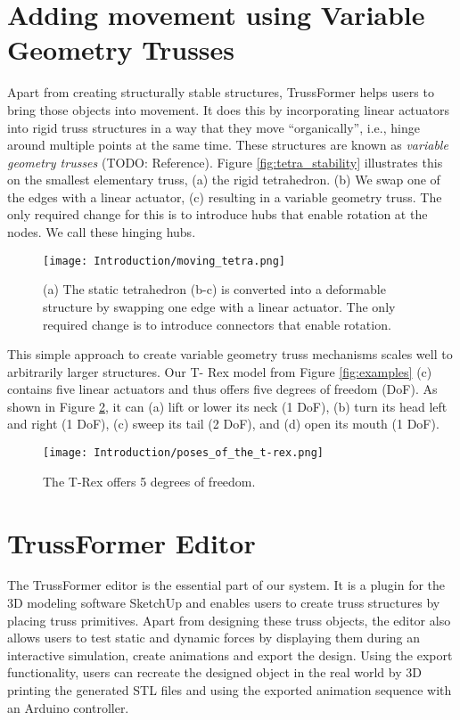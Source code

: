 \section{Adding movement using Variable Geometry Trusses}
Apart from creating structurally stable structures, TrussFormer helps users to bring those objects into movement. It does this by incorporating linear actuators into rigid truss structures in a way that they move ``organically'', i.e., hinge around multiple points at the same time. These structures are known as \textit{variable geometry trusses} (TODO: Reference).
Figure \ref{fig:tetra_stability} illustrates this on the smallest elementary truss, (a) the rigid tetrahedron. (b) We swap one of the edges with a linear actuator, (c) resulting in a variable geometry truss. The only required change for this is to introduce hubs that enable rotation at the nodes. We call these hinging hubs.
\begin{figure}[h!]
    \texttt{[image: Introduction/moving\_tetra.png]}
    \centering
    \caption{(a) The static tetrahedron (b-c) is converted into a deformable structure by swapping one edge with a linear actuator. The only required change is to introduce connectors that enable rotation.}
    \label{fig:moving_tetra}
\end{figure}
This simple approach to create variable geometry truss mechanisms scales well to arbitrarily larger structures. Our T- Rex model from Figure \ref{fig:examples} (c) contains five linear actuators and thus offers five degrees of freedom (DoF). As shown in Figure \ref{fig:t-rex_poses}, it can (a) lift or lower its neck (1 DoF), (b) turn its head left and right (1 DoF), (c) sweep its tail (2 DoF), and (d) open its mouth (1 DoF).
\begin{figure}[h!]
    \texttt{[image: Introduction/poses\_of\_the\_t-rex.png]}
    \centering
    \caption{The T-Rex offers 5 degrees of freedom.}
    \label{fig:t-rex_poses}
\end{figure}

\section{TrussFormer Editor}
The TrussFormer editor is the essential part of our system. It is a plugin for the 3D modeling software SketchUp and enables users to create truss structures by placing truss primitives. Apart from designing these truss objects, the editor also allows users to test static and dynamic forces by displaying them during an interactive simulation, create animations and export the design. Using the export functionality, users can recreate the designed object in the real world by 3D printing the generated STL files and using the exported animation sequence with an Arduino controller.
